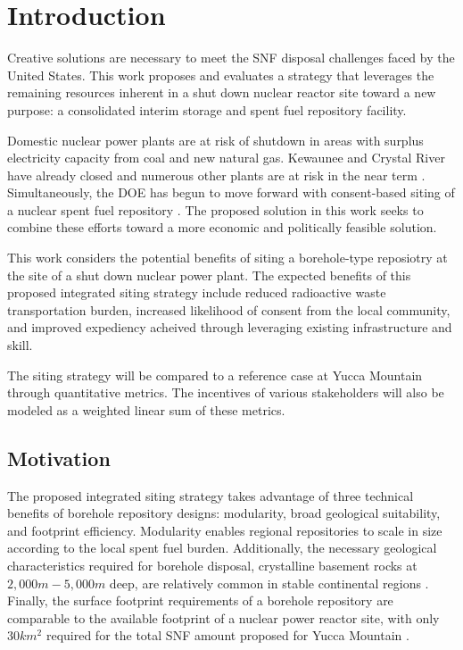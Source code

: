 
\section{Introduction}
Creative solutions are necessary to meet the \gls{SNF} disposal challenges 
faced by the United States.
This work proposes and evaluates a strategy that leverages the 
remaining resources inherent in a shut down nuclear reactor site toward a new 
purpose: a consolidated interim storage and spent fuel repository facility.

Domestic nuclear power plants are at risk of shutdown in areas with surplus 
electricity capacity from coal and new natural gas. Kewaunee and Crystal River 
have already closed  and numerous other plants are at risk in the near term 
\cite{nei_nuclear_2016}.  Simultaneously, the \gls{DOE} 
has begun to move forward with consent-based siting of a nuclear 
spent fuel repository \cite{doe_designing_2016}. The proposed solution in this 
work seeks to combine these efforts toward a more economic and politically 
feasible solution. 

This work considers the potential benefits of siting a borehole-type reposiotry 
at the site of a shut down nuclear power plant.  The  expected benefits of this 
proposed integrated siting strategy include reduced radioactive waste 
transportation burden, increased likelihood of consent from the local 
community, and improved expediency acheived through leveraging existing 
infrastructure and skill.

The siting strategy will be compared to a reference case at 
Yucca Mountain through quantitative metrics. The incentives of various 
stakeholders will also be modeled as a weighted linear sum of these 
metrics. 

\subsection{Motivation}
The proposed integrated siting strategy takes advantage of three technical 
benefits of borehole repository designs: modularity, broad geological 
suitability, and footprint efficiency. Modularity enables regional repositories 
to scale in size according to the local spent fuel burden. 
Additionally, the necessary geological characteristics required for borehole 
disposal, crystalline basement rocks at $2,000 m - 5,000 m$ deep, are relatively 
common in stable continental regions \cite{arnold_research_2012}. Finally, the 
surface footprint requirements of a borehole repository are comparable to the 
available footprint of a nuclear power reactor site, with only $30 km^2$ 
required for the total \gls{SNF} amount proposed for Yucca Mountain 
\cite{brady_deep_2009}.

